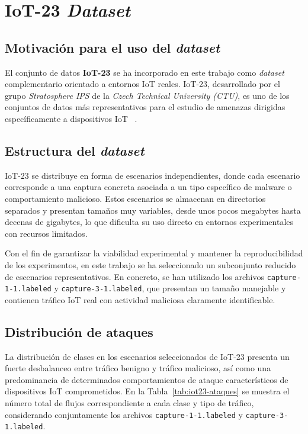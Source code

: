 
\section{IoT-23 \textit{Dataset}}

\subsection{Motivación para el uso del \textit{dataset}}

El conjunto de datos \textbf{IoT-23} se ha incorporado en este trabajo como \textit{dataset} complementario orientado a entornos IoT reales. IoT-23, desarrollado por el grupo \emph{Stratosphere IPS} de la \emph{Czech Technical University (CTU)}, es uno de los conjuntos de datos más representativos para el estudio de amenazas dirigidas específicamente a dispositivos IoT ~\cite{iot-23}.

\subsection{Estructura del \textit{dataset}}

IoT-23 se distribuye en forma de escenarios independientes, donde cada escenario corresponde a una captura concreta asociada a un tipo específico de malware o comportamiento malicioso. Estos escenarios se almacenan en directorios separados y presentan tamaños muy variables, desde unos pocos megabytes hasta decenas de gigabytes, lo que dificulta su uso directo en entornos experimentales con recursos limitados.

Con el fin de garantizar la viabilidad experimental y mantener la reproducibilidad de los experimentos, en este trabajo se ha seleccionado un subconjunto reducido de escenarios representativos. En concreto, se han utilizado los archivos \texttt{capture-1-1.labeled} y \texttt{capture-3-1.labeled}, que presentan un tamaño manejable y contienen tráfico IoT real con actividad maliciosa claramente identificable.

\subsection{Distribución de ataques}

La distribución de clases en los escenarios seleccionados de IoT-23 presenta un fuerte desbalanceo entre tráfico benigno y tráfico malicioso, así como una predominancia de determinados comportamientos de ataque característicos de dispositivos IoT comprometidos. En la Tabla~\ref{tab:iot23-ataques} se muestra el número total de flujos correspondiente a cada clase y tipo de tráfico, considerando conjuntamente los archivos \texttt{capture-1-1.labeled} y \texttt{capture-3-1.labeled}.

